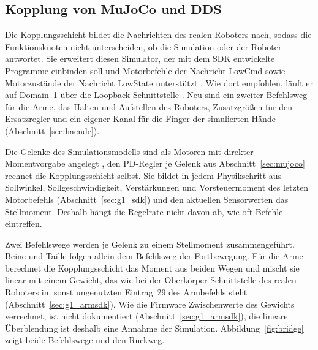 \subsection{Kopplung von MuJoCo und DDS}
\label{sec:bridge}
Die Kopplungsschicht bildet die Nachrichten des realen Roboters nach, sodass die Funktionsknoten nicht unterscheiden, ob die Simulation oder der Roboter antwortet.
Sie erweitert diesen Simulator, der mit dem SDK entwickelte Programme einbinden soll \cite{UnitreeMujoco} und Motorbefehle der Nachricht LowCmd sowie Motorzustände der Nachricht LowState unterstützt \cite{UnitreeMujoco}.
Wie dort empfohlen, läuft er auf Domain~1 über die Loopback-Schnittstelle \cite{UnitreeMujoco}.
Neu sind ein zweiter Befehlsweg für die Arme, das Halten und Aufstellen des Roboters, Zusatzgrößen für den Ersatzregler und ein eigener Kanal für die Finger der simulierten Hände (Abschnitt~\ref{sec:haende}).

Die Gelenke des Simulationsmodells sind als Motoren mit direkter Momentvorgabe angelegt \cite{MujocoDoku2026}, den PD-Regler je Gelenk aus Abschnitt~\ref{sec:mujoco} rechnet die Kopplungsschicht selbst.
Sie bildet in jedem Physikschritt aus Sollwinkel, Sollgeschwindigkeit, Verstärkungen und Vorsteuermoment des letzten Motorbefehls (Abschnitt~\ref{sec:g1_sdk}) und den aktuellen Sensorwerten das Stellmoment.
Deshalb hängt die Regelrate nicht davon ab, wie oft Befehle eintreffen.

Zwei Befehlswege werden je Gelenk zu einem Stellmoment zusammengeführt.
Beine und Taille folgen allein dem Befehlsweg der Fortbewegung.
Für die Arme berechnet die Kopplungsschicht das Moment aus beiden Wegen und mischt sie linear mit einem Gewicht, das wie bei der Oberkörper-Schnittstelle des realen Roboters im sonst ungenutzten Eintrag~29 des Armbefehls steht (Abschnitt~\ref{sec:g1_armsdk}).
Wie die Firmware Zwischenwerte des Gewichts verrechnet, ist nicht dokumentiert (Abschnitt~\ref{sec:g1_armsdk}), die lineare Überblendung ist deshalb eine Annahme der Simulation.
Abbildung~\ref{fig:bridge} zeigt beide Befehlswege und den Rückweg.

